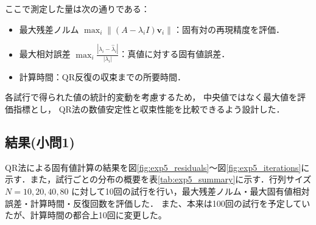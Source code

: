 \documentclass[a4paper,11pt]{ltjsarticle}
\begin{document}
ここで測定した量は次の通りである：
\begin{itemize}
  \item 最大残差ノルム $\displaystyle \max_i \| (A - \lambda_i I)\boldsymbol{v}_i \|$：固有対の再現精度を評価．
  \item 最大相対誤差 $\displaystyle \max_i \frac{|\lambda_i - \hat{\lambda}_i|}{|\lambda_i|}$：真値に対する固有値誤差．
  \item 計算時間：QR反復の収束までの所要時間．
\end{itemize}

各試行で得られた値の統計的変動を考慮するため，
中央値ではなく最大値を評価指標とし，
QR法の数値安定性と収束性能を比較できるよう設計した．


\subsection{結果(小問1)}
QR法による固有値計算の結果を図\ref{fig:exp5_residuals}～図\ref{fig:exp5_iterations}に示す．また，試行ごとの分布の概要を表\ref{tab:exp5_summary}に示す．行列サイズ $N=10, 20, 40, 80$ に対して10回の試行を行い，最大残差ノルム・最大固有値相対誤差・計算時間・反復回数を評価した．
また、本来は100回の試行を予定していたが、計算時間の都合上10回に変更した。
\end{document}

